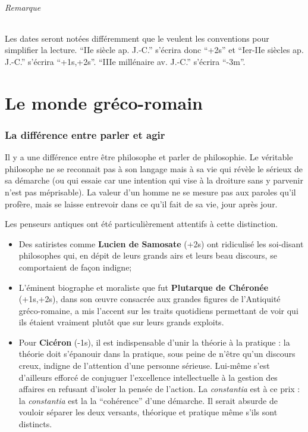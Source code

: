 

\usepackage{tikz}



\maketitle

\paragraph{Remarque}
Les dates seront notées différemment que le veulent les conventions pour simplifier la lecture.
``IIe siècle ap. J.-C.'' s'écrira donc ``+2s'' et
``Ier-IIe siècles ap. J.-C.'' s'écrira ``+1s,+2s''.
``IIIe millénaire av. J.-C.'' s'écrira ``-3m''.

\part{Le monde gréco-romain}

\section{La différence entre parler et agir}
Il y a une différence entre être philosophe et parler de philosophie.
Le véritable philosophe ne se reconnait pas à son langage mais à sa vie qui révèle le sérieux de sa démarche
(ou qui essaie car une intention qui vise à la droiture sans y parvenir n'est pas méprisable).
La valeur d'un homme ne se mesure pas aux paroles qu'il profère,
mais se laisse entrevoir dans ce qu'il fait de sa vie, jour après jour.

Les penseurs antiques ont été particulièrement attentifs à cette distinction.
\begin{itemize}
	\item Des satiristes comme \textbf{Lucien de Samosate} (+2s) ont ridiculisé les soi-disant philosophes qui,
		en dépit de leurs grands airs et leurs beau discours, se comportaient de façon indigne;
	\item L'éminent biographe et moraliste que fut \textbf{Plutarque de Chéronée} (+1s,+2s),
		dans son œuvre consacrée aux grandes figures de l'Antiquité gréco-romaine,
		a mis l'accent sur les traits quotidiens permettant de voir qui ils étaient vraiment plutôt que sur leurs grands exploits.
	\item Pour \textbf{Cicéron} (-1s), il est indispensable d'unir la théorie à la pratique :
		la théorie doit s'épanouir dans la pratique, sous peine de n'être qu'un discours
		creux, indigne de l'attention d'une personne sérieuse.
		Lui-même s'est d'ailleurs efforcé de
		conjuguer l'excellence intellectuelle à la gestion des affaires en refusant d'isoler la pensée
		de l'action. La \textit{constantia} est à ce prix : la \textit{constantia} est la
		la ``cohérence'' d'une démarche. Il serait absurde de vouloir séparer les deux versants, théorique et pratique
		même s'ils sont distincts.
\end{itemize}

